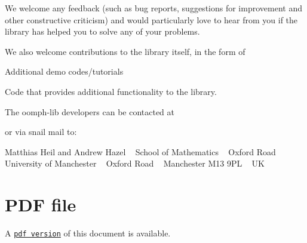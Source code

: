 We welcome any feedback (such as bug reports, suggestions for improvement and other constructive criticism) and would particularly love to hear from you if the library has helped you to solve any of your problems.

We also welcome contributions to the library itself, in the form of
\begin{DoxyItemize}
\item Additional demo codes/tutorials
\item Code that provides additional functionality to the library.
\end{DoxyItemize}The {\ttfamily oomph-\/lib} developers can be contacted at \begin{center}\end{center} 

\begin{center} \end{center} 

or via snail mail to\+:

{\ttfamily  Matthias Heil and Andrew Hazel ~\newline
School of Mathematics ~\newline
Oxford Road ~\newline
University of Manchester ~\newline
Oxford Road ~\newline
Manchester M13 9\+PL ~\newline
UK }



 

 \hypertarget{index_pdf}{}\section{P\+D\+F file}\label{index_pdf}
A \href{../latex/refman.pdf}{\tt pdf version} of this document is available. 
